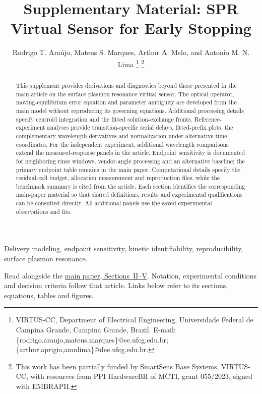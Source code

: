 \documentclass[lettersize,journal]{IEEEtran}
\newcommand{\mainpaper}[1]{\href{SPR_smart_stop_current.pdf}{main paper, #1}}
\begin{document}
\title{Supplementary Material: SPR Virtual Sensor for Early Stopping}
\author{Rodrigo T. Ara\'ujo, Mateus S. Marques,
Arthur A. Melo, and Antonio M. N. Lima
\thanks{\raggedright VIRTUS-CC, Department of Electrical Engineering, Universidade Federal de
Campina Grande, Campina Grande, Brazil. E-mail:
\{rodrigo.araujo,mateus.marques\}@ee.ufcg.edu.br;
\{arthur.aprigio,amnlima\}@dee.ufcg.edu.br.}
\thanks{\raggedright This work has been partially funded by SmartSens Base Systems,
VIRTUS-CC, with resources from PPI HardwareBR of MCTI, grant 055/2023,
signed with EMBRAPII.}}


\maketitle

\begin{abstract}
This supplement provides derivations and diagnostics beyond those presented
in the main article on the surface plasmon resonance virtual sensor.
The optical operator, moving-equilibrium error equation and parameter
ambiguity are developed from the main model without reproducing its
governing equations. Additional processing details specify centroid
integration and the fitted solution-exchange fronts. Reference-experiment
analyses provide transition-specific serial delays, fitted-prefix plots,
the complementary wavelength derivatives and normalization under alternative
time coordinates. For the independent experiment, additional wavelength
comparisons extend the measured-response panels in
the article. Endpoint sensitivity is documented for neighboring rinse
windows, vendor-angle processing and an alternative baseline; the primary
endpoint table remains in the main paper. Computational details specify
the residual-call budget, allocation measurement and reproduction files,
while the benchmark summary is cited from the article. Each section
identifies the corresponding main-paper material so that shared definitions,
results and experimental qualifications can be consulted directly. All
additional panels use the saved experimental observations and fits.
\end{abstract}
\begin{IEEEkeywords}
Delivery modeling, endpoint sensitivity, kinetic identifiability,
reproducibility, surface plasmon resonance.
\end{IEEEkeywords}
\raggedbottom
\noindent Read alongside the \mainpaper{Sections~II--V}. Notation,
experimental conditions and decision criteria follow that article.
Links below refer to its sections, equations, tables and figures.
\tableofcontents
\end{document}
